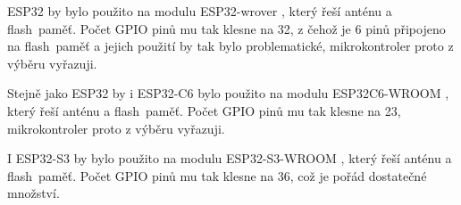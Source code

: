 
ESP32 by bylo použito na modulu ESP32-wrover \cite{ESP32-WROOM}, který řeší anténu a flash~paměť.
Počet GPIO pinů mu tak klesne na 32, z čehož je 6 pinů připojeno na flash~paměť a jejich použití by tak bylo problematické, mikrokontroler proto z výběru vyřazuji.


Stejně jako ESP32 by i ESP32-C6 bylo použito na modulu ESP32C6-WROOM \cite{ESP32C6-WROOM}, který řeší anténu a flash~paměť.
Počet GPIO pinů mu tak klesne na 23, mikrokontroler proto z výběru vyřazuji.


I ESP32-S3 by bylo použito na modulu ESP32-S3-WROOM \cite{ESP32S3-WROOM}, který řeší anténu a flash~paměť.
Počet GPIO pinů mu tak klesne na 36, což je pořád dostatečné množství.


